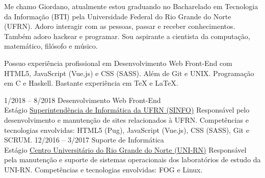 \documentclass[9pt]{developercv}
\begin{document}
	\maketitle

	\begin{minipage}[t]{1\textwidth}
		Me chamo Giordano, atualmente estou gradu\-ando no Bacharelado em Tecnologia da Informação (BTI) pela Universidade Federal do Rio Grande do Norte (UFRN).
		Adoro interagir com as pessoas, passar e receber conhecimentos. Também adoro hackear e programar. Sou aspirante a cientista da computação, matemático, filósofo e músico.
	\end{minipage}
	
	\begin{minipage}[t]{1\textwidth}
		Possuo experiência profissional em Desenvolvimento Web Front-End com HTML5, JavaScript (Vue.js) e CSS (SASS). Além de Git e UNIX. Programação em C e Haskell. Bastante experiência em \TeX{} e \LaTeX{}.
	\end{minipage}


	\begin{entrylist}
		\entry
			{1/2018 -- 8/2018}
			{Desenvolvimento Web Front-End\\
				\footnotesize{Estágio}}
			{\href{https://www.info.ufrn.br/}{Superintendência de Informática da UFRN (SINFO)}}
			{Responsável pelo desenvolvimento e manutenção de sites relacionados à UFRN.
				Competências e tecnologias envolvidas: HTML5 (Pug), JavaScript (Vue.js), CSS (SASS), Git e SCRUM.}
		\entry
			{12/2016 -- 3/2017}
			{Suporte de Informática\\
				\footnotesize{Estágio}}
			{\href{http://unirn.edu.br/}{Centro Universitário do Rio Grande do Norte (UNI-RN)}}
			{Responsável pela manutenção e suporte de sistemas operacionais dos laboratórios de estudo da UNI-RN.
				Competências e tecnologias envolvidas: FOG e Linux.}
	\end{entrylist}
\end{document}
